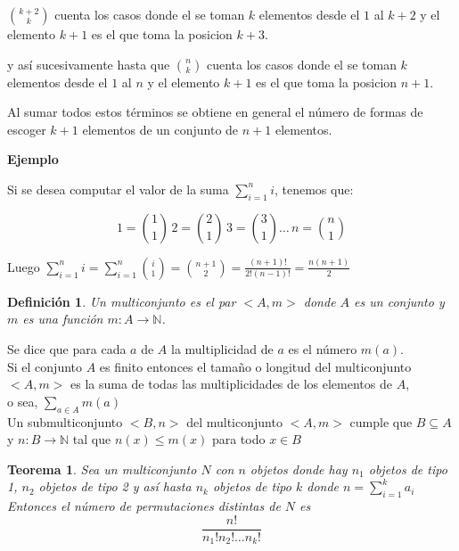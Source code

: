 \documentclass[a4paper,12pt]{report}
\newtheorem*{teo}{Teorema}
\newtheorem*{dfn}{Definición}
\begin{document}
\begin{enumerate}
 ${k+2}\choose{k}$ cuenta los casos donde el se toman $k$ elementos desde el $1$ al $k+2$ y el elemento $k+1$ es el que toma la posicion $k+3$.

 y as\'i sucesivamente hasta que  ${n}\choose{k}$ cuenta los casos donde el se toman $k$ elementos desde el $1$ al $n$ y el elemento $k+1$ es el que toma la posicion $n+1$.

 Al sumar todos estos t\'erminos se obtiene en general el n\'umero de formas de escoger $k+1$ elementos de un conjunto de $n+1$ elementos.

\end{enumerate}

\textbf{Ejemplo}

Si se desea computar el valor de la suma $\sum_{i=1}^{n} i$, tenemos que:

$$1 = \binom{1}{1} \, 2 = \binom{2}{1} \, 3=\binom{3}{1} \dots \, n=\binom{n}{1}$$

Luego $\sum_{i=1}^{n} i = \sum_{i=1}^{n}$${i}\choose{1}$$=$${n+1}\choose{2}$$= \frac{(n+1)!}{2!(n-1)!} = \frac{n(n+1)}{2}$


\begin{dfn}
 Un multiconjunto es el  par $<A,m>$ donde $A$ es un conjunto y $m$ es una función $m:A\rightarrow \mathbb{N}$. 
\end{dfn}

Se dice que para cada $a$ de $A$ la multiplicidad de $a$ es el número $m(a)$.\\

Si el conjunto $A$ es finito entonces el tamaño o longitud del multiconjunto $<A,m>$ es la suma de todas las multiplicidades de los elementos de $A$,\\ o sea, $\sum_{a\in A}m(a)$\\

Un submulticonjunto $<B,n>$ del multiconjunto $<A,m>$ cumple que $B\subseteq A$ y $n:B\rightarrow \mathbb{N}$ tal que $n(x)\leq m(x)$ para todo $x\in B$ 

\begin{teo}
 Sea un multiconjunto $N$ con $n$ objetos donde hay $n_1$ objetos de tipo 1, $n_2$ objetos de tipo 2 y así hasta $n_k$ objetos de tipo $k$ donde $n=\sum^k_{i=1}a_i$\\
 Entonces el número de permutaciones distintas de $N$ es $$\frac{n!}{n_1! n_2! \dots n_k!}$$
\end{teo}
\end{document}
